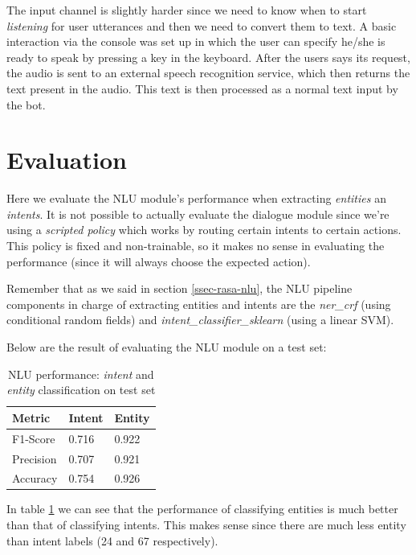 \documentclass[11pt,a4paper]{article}
\begin{document}
			The input channel is slightly harder since we need to know when to start \textit{listening} for user utterances and then we need to convert them to text. A basic interaction via the console was set up in which the user can specify he/she is ready to speak by pressing a key in the keyboard. After the users says its request, the audio is sent to an external speech recognition service, which then returns the text present in the audio. This text is then processed as a normal text input by the bot.
			
			
\section{Evaluation}
\label{sec-evaluation}

	Here we evaluate the NLU module's performance when extracting \textit{entities} an \textit{intents}. It is not possible to actually evaluate the dialogue module since we're using a \textit{scripted policy} which works by routing certain intents to certain actions. This policy is fixed and non-trainable, so it makes no sense in evaluating the performance (since it will always choose the expected action). 
	
	Remember that as we said in section \ref{ssec-rasa-nlu}, the NLU pipeline components in charge of extracting entities and intents are the \textit{ner\_crf} (using conditional random fields) and \textit{intent\_classifier\_sklearn} (using a linear SVM).
	
	Below are the result of evaluating the NLU module on a test set:
	
	\begin{table}[h!]
		\centering
		\begin{tabular}{l|l|l}
			\textbf{Metric} & \textbf{Intent} & \textbf{Entity} \\ 
			\hline 
			F1-Score & 0.716 & 0.922 \\ 
			\hline 
			Precision & 0.707 & 0.921 \\ 
			\hline 
			Accuracy & 0.754 & 0.926\\ 
			\hline 
		\end{tabular} 
		\caption{NLU performance: \textit{intent} and \textit{entity} classification on test set}
		\label{table:1}
	\end{table}
		
	In table \ref{table:1} we can see that the performance of classifying entities is much better than that of classifying intents. This makes sense since there are much less entity than intent labels (24 and 67 respectively).
	
\end{document}

